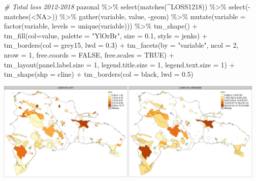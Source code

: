 \documentclass[10pt,landscape,a3paper]{article}
\newenvironment{Shaded}{\begin{snugshade}}{\end{snugshade}}
\newcommand{\AttributeTok}[1]{\textcolor[rgb]{0.77,0.63,0.00}{#1}}
\newcommand{\CommentTok}[1]{\textcolor[rgb]{0.56,0.35,0.01}{\textit{#1}}}
\newcommand{\ConstantTok}[1]{\textcolor[rgb]{0.00,0.00,0.00}{#1}}
\newcommand{\DecValTok}[1]{\textcolor[rgb]{0.00,0.00,0.81}{#1}}
\newcommand{\FloatTok}[1]{\textcolor[rgb]{0.00,0.00,0.81}{#1}}
\newcommand{\FunctionTok}[1]{\textcolor[rgb]{0.00,0.00,0.00}{#1}}
\newcommand{\NormalTok}[1]{#1}
\newcommand{\SpecialCharTok}[1]{\textcolor[rgb]{0.00,0.00,0.00}{#1}}
\newcommand{\StringTok}[1]{\textcolor[rgb]{0.31,0.60,0.02}{#1}}
\begin{document}
\begin{Shaded}
\begin{Highlighting}[]

\CommentTok{\# Total loss 2012{-}2018}
\NormalTok{pazonal }\SpecialCharTok{\%\textgreater{}\%} \FunctionTok{select}\NormalTok{(}\FunctionTok{matches}\NormalTok{(}\StringTok{\textquotesingle{}\^{}LOSS1218\textquotesingle{}}\NormalTok{)) }\SpecialCharTok{\%\textgreater{}\%} \FunctionTok{select}\NormalTok{(}\SpecialCharTok{{-}}\FunctionTok{matches}\NormalTok{(}\StringTok{\textquotesingle{}\textless{}NA\textgreater{}\textquotesingle{}}\NormalTok{)) }\SpecialCharTok{\%\textgreater{}\%} 
  \FunctionTok{gather}\NormalTok{(variable, value, }\SpecialCharTok{{-}}\NormalTok{geom) }\SpecialCharTok{\%\textgreater{}\%}
  \FunctionTok{mutate}\NormalTok{(}\AttributeTok{variable =} \FunctionTok{factor}\NormalTok{(variable, }\AttributeTok{levels =} \FunctionTok{unique}\NormalTok{(variable))) }\SpecialCharTok{\%\textgreater{}\%} 
  \FunctionTok{tm\_shape}\NormalTok{() }\SpecialCharTok{+}
  \FunctionTok{tm\_fill}\NormalTok{(}\AttributeTok{col=}\StringTok{\textquotesingle{}value\textquotesingle{}}\NormalTok{, }\AttributeTok{palette =} \StringTok{"YlOrBr"}\NormalTok{, }\AttributeTok{size =} \FloatTok{0.1}\NormalTok{, }\AttributeTok{style =} \StringTok{\textquotesingle{}jenks\textquotesingle{}}\NormalTok{) }\SpecialCharTok{+}
  \FunctionTok{tm\_borders}\NormalTok{(}\AttributeTok{col =} \StringTok{\textquotesingle{}grey15\textquotesingle{}}\NormalTok{, }\AttributeTok{lwd =} \FloatTok{0.3}\NormalTok{) }\SpecialCharTok{+}
  \FunctionTok{tm\_facets}\NormalTok{(}\AttributeTok{by =} \StringTok{"variable"}\NormalTok{, }\AttributeTok{ncol =} \DecValTok{2}\NormalTok{, }\AttributeTok{nrow =} \DecValTok{1}\NormalTok{, }\AttributeTok{free.coords =} \ConstantTok{FALSE}\NormalTok{, }\AttributeTok{free.scales =} \ConstantTok{TRUE}\NormalTok{) }\SpecialCharTok{+}
  \FunctionTok{tm\_layout}\NormalTok{(}\AttributeTok{panel.label.size =} \DecValTok{1}\NormalTok{, }\AttributeTok{legend.title.size =} \DecValTok{1}\NormalTok{, }\AttributeTok{legend.text.size =} \DecValTok{1}\NormalTok{) }\SpecialCharTok{+} 
  \FunctionTok{tm\_shape}\NormalTok{(}\AttributeTok{shp =}\NormalTok{ cline) }\SpecialCharTok{+} \FunctionTok{tm\_borders}\NormalTok{(}\AttributeTok{col =} \StringTok{\textquotesingle{}black\textquotesingle{}}\NormalTok{, }\AttributeTok{lwd =} \FloatTok{0.5}\NormalTok{)}
\end{Highlighting}
\end{Shaded}

\begin{center}\includegraphics{img/data-download-preparation-eda/zonal-pa-7} \end{center}
\end{document}
